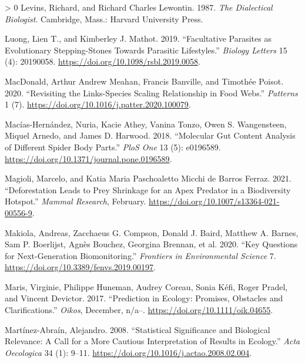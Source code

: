 \documentclass[10pt,oneside]{article}
\newlength{\cslhangindent}
\newenvironment{CSLReferences}[3] %
 {%
  \setlength{\parindent}{0pt}
  \ifodd #1 \everypar{\setlength{\hangindent}{\cslhangindent}}\ignorespaces\fi
  \ifnum #2 > 0
  \setlength{\parskip}{#2\baselineskip}
  \fi
 }%
 {}
\begin{document}
\begin{CSLReferences}{1}{0}
\leavevmode\hypertarget{ref-Levins1987DiaBio}{}%
Levins, Richard, and Richard Charles Lewontin. 1987. \emph{The
Dialectical Biologist}. Cambridge, Mass.: Harvard University Press.

\leavevmode\hypertarget{ref-Luong2019FacPar}{}%
Luong, Lien T., and Kimberley J. Mathot. 2019. {``Facultative Parasites
as Evolutionary Stepping-Stones Towards Parasitic Lifestyles.''}
\emph{Biology Letters} 15 (4): 20190058.
\url{https://doi.org/10.1098/rsbl.2019.0058}.

\leavevmode\hypertarget{ref-MacDonald2020RevLin}{}%
MacDonald, Arthur Andrew Meahan, Francis Banville, and Timothée Poisot.
2020. {``Revisiting the Links-Species Scaling Relationship in Food
Webs.''} \emph{Patterns} 1 (7).
\url{https://doi.org/10.1016/j.patter.2020.100079}.

\leavevmode\hypertarget{ref-Macias-Hernandez2018MolGut}{}%
Macías-Hernández, Nuria, Kacie Athey, Vanina Tonzo, Owen S. Wangensteen,
Miquel Arnedo, and James D. Harwood. 2018. {``Molecular Gut Content
Analysis of Different Spider Body Parts.''} \emph{PloS One} 13 (5):
e0196589. \url{https://doi.org/10.1371/journal.pone.0196589}.

\leavevmode\hypertarget{ref-Magioli2021DefLea}{}%
Magioli, Marcelo, and Katia Maria Paschoaletto Micchi de Barros Ferraz.
2021. {``Deforestation Leads to Prey Shrinkage for an Apex Predator in a
Biodiversity Hotspot.''} \emph{Mammal Research}, February.
\url{https://doi.org/10.1007/s13364-021-00556-9}.

\leavevmode\hypertarget{ref-Makiola2020KeyQue}{}%
Makiola, Andreas, Zacchaeus G. Compson, Donald J. Baird, Matthew A.
Barnes, Sam P. Boerlijst, Agnès Bouchez, Georgina Brennan, et al. 2020.
{``Key Questions for Next-Generation Biomonitoring.''} \emph{Frontiers
in Environmental Science} 7.
\url{https://doi.org/10.3389/fenvs.2019.00197}.

\leavevmode\hypertarget{ref-Maris2017PreEco}{}%
Maris, Virginie, Philippe Huneman, Audrey Coreau, Sonia Kéfi, Roger
Pradel, and Vincent Devictor. 2017. {``Prediction in Ecology: Promises,
Obstacles and Clarifications.''} \emph{Oikos}, December, n/a--.
\url{https://doi.org/10.1111/oik.04655}.

\leavevmode\hypertarget{ref-Martinez-Abrain2008StaSig}{}%
Martínez-Abraín, Alejandro. 2008. {``Statistical Significance and
Biological Relevance: A Call for a More Cautious Interpretation of
Results in Ecology.''} \emph{Acta Oecologica} 34 (1): 9--11.
\url{https://doi.org/10.1016/j.actao.2008.02.004}.


\end{CSLReferences}
\end{document}
